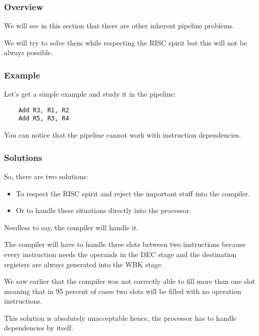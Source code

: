 
\begin{frame}
  \frametitle{Overview}

  We will see in this section that there are other inherent pipeline
  problems.

  \-

  We will try to solve them while respecting the RISC spirit but
  this will not be always possible.
\end{frame}


\begin{frame}[containsverbatim]
  \frametitle{Example}

  Let's get a simple example and study it in the pipeline:

  \begin{verbatim}
    Add R3, R1, R2
    Add R5, R3, R4
  \end{verbatim}

  \begin{center}
  \end{center}

  You can notice that the pipeline cannot work with instruction dependencies.
\end{frame}


\begin{frame}
  \frametitle{Solutions}

  So, there are two solutions:

  \begin{itemize}
    \item
      To respect the RISC spirit and reject the important stuff into the
      compiler.
    \item
      Or to handle these situations directly into the processor.
  \end{itemize}

  \-

  Needless to say, the compiler will handle it.

  \-

  The compiler will have to handle three slots between two instructions
  because every instruction needs the operands in the DEC stage and the
  destination registers are always generated into the WBK stage.

  \-

  We saw earlier that the compiler was not correctly able to fill more than
  one slot meaning that in 95 percent of cases two slots will be filled
  with no operation instructions.

  \-

  This solution is absolutely unacceptable hence, the processor has to
  handle dependencies by itself.
\end{frame}

